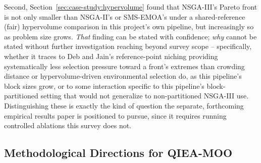 Second, Section~\ref{sec:case-study:hypervolume} found that NSGA-III's
Pareto front is not only smaller than NSGA-II's or SMS-EMOA's under a
shared-reference (fair) hypervolume comparison in this project's own
pipeline, but increasingly so as problem size grows. \emph{That} finding
can be stated with confidence; \emph{why} cannot be stated
without further investigation reaching beyond survey scope --
specifically, whether it traces to Deb and Jain's reference-point
niching providing systematically less selection pressure toward a
front's extremes than crowding distance or hypervolume-driven
environmental selection do, as this pipeline's block sizes grow, or to
some interaction specific to this pipeline's block-partitioned setting
that would not generalize to non-partitioned NSGA-III use. Distinguishing
these is exactly the kind of question the separate, forthcoming
empirical results paper is positioned to pursue, since it requires
running controlled ablations this survey does not.

\subsection{Methodological Directions for QIEA-MOO}
\label{sec:open-challenges:methodological}

